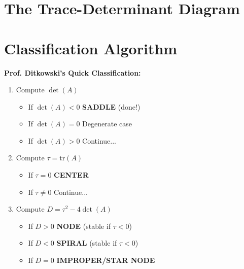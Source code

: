 \documentclass[12pt]{article}
\begin{document}
\section{The Trace-Determinant Diagram}

\begin{center}
\end{center}

\section{Classification Algorithm}

\begin{quickcheck}
\textbf{Prof. Ditkowski's Quick Classification:}
\begin{enumerate}
    \item Compute $\det(A)$
    \begin{itemize}
        \item If $\det(A) < 0$ \rightarrow \textbf{SADDLE} (done!)
        \item If $\det(A) = 0$ \rightarrow Degenerate case
        \item If $\det(A) > 0$ \rightarrow Continue...
    \end{itemize}
    \item Compute $\tau = \text{tr}(A)$
    \begin{itemize}
        \item If $\tau = 0$ \rightarrow \textbf{CENTER}
        \item If $\tau \neq 0$ \rightarrow Continue...
    \end{itemize}
    \item Compute $D = \tau^{2} - 4\det(A)$
    \begin{itemize}
        \item If $D > 0$ \rightarrow \textbf{NODE} (stable if $\tau < 0$)
        \item If $D < 0$ \rightarrow \textbf{SPIRAL} (stable if $\tau < 0$)
        \item If $D = 0$ \rightarrow \textbf{IMPROPER/STAR NODE}
    \end{itemize}
\end{enumerate}
\end{quickcheck}
\end{document}
